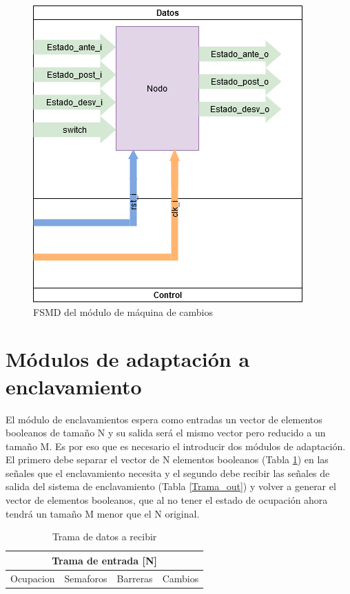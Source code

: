 	\begin{figure}[h]
	\centering
	\includegraphics[scale=.5]{./Figures/FSMD-Cambio}
		\caption{FSMD del módulo de máquina de cambios}
		\label{fig:FSMD_Cambio}
	\end{figure}
		
	
\section{Módulos de adaptación a enclavamiento}

	El módulo de enclavamientos espera como entradas un vector de elementos booleanos de tamaño N y su salida será el mismo vector pero reducido a un tamaño M. Es por eso que es necesario el introducir dos módulos de adaptación. El primero debe separar el vector de N elementos booleanos (Tabla \ref{Trama_in}) en las señales que el enclavamiento necesita y el segundo debe recibir las señales de salida del sistema de enclavamiento (Tabla \ref{Trama_out}) y volver a generar el vector de elementos booleanos, que al no tener el estado de ocupación ahora tendrá un tamaño M menor que el N original. 
	 
	\begin{table}[!hbt]
	\renewcommand{\arraystretch}{1.3}
	\caption{Trama de datos a recibir}
	\label{Trama_in}
	\centering
	\begin{tabular}{| c | c | c | c |}
	\multicolumn{4}{c}{Trama de entrada [N]} \\
	\hline
	Ocupacion & Semaforos & Barreras & Cambios \\	
	\hline
	\end{tabular}
	\end{table}	 
	
